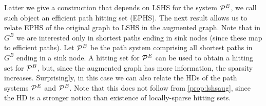 
Latter we give a construction that depends on LSHS for the system $\mathcal{P}^E$, we call such object an efficient path hitting set (EPHS).
The next result allows us to relate EPHS of the original graph to LSHS in the augmented graph.
Note that in $G^B$ we are interested only in shortest paths ending in sink nodes (since these map to efficient paths). 
Let $\mathcal{P}^B$ be the path system comprising all shortest paths in $G^B$ ending in a sink node.
A hitting set for $\mathcal{P}^E$ can be used to obtain a hitting set for $\mathcal{P}^B$, but, since the augmented graph has more information, the sparsity increases.
Surprisingly, in this case we can also relate the HDs of the path systems $\mathcal{P}^E$ and $\mathcal{P}^B$.
Note that this does not follow from \cref{prop:lshsaug}, since the HD is a stronger notion than existence of locally-sparse hitting sets.

%

